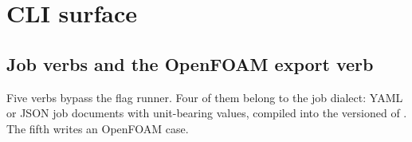 \section{CLI surface}\label{sec:df-surface}

\subsection{Job verbs and the OpenFOAM export verb}\label{sec:df-verbs}

Five verbs bypass the flag runner. Four of them belong to the job dialect: YAML or JSON job documents with unit-bearing values, compiled into the versioned  of . The fifth writes an OpenFOAM case.

